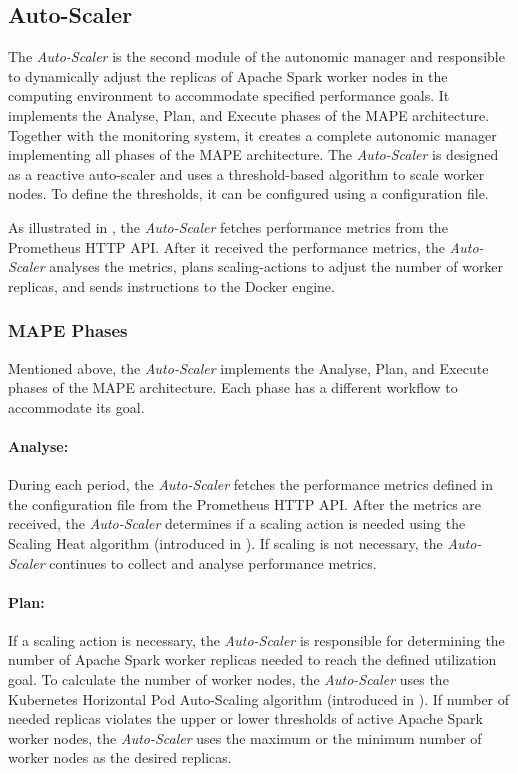 \subsection{Auto-Scaler}
The \textit{Auto-Scaler} is the second module of the autonomic manager and responsible to dynamically adjust the replicas of Apache Spark worker nodes in the computing environment to accommodate specified performance goals. 
It implements the Analyse, Plan, and Execute phases of the MAPE architecture. Together with the monitoring system, it creates a complete autonomic manager implementing all phases of the MAPE architecture.
The \textit{Auto-Scaler} is designed as a reactive auto-scaler and uses a threshold-based algorithm to scale worker nodes. To define the thresholds, it can be configured using a configuration file.


As illustrated in , the \textit{Auto-Scaler} fetches performance metrics from the Prometheus HTTP API.
After it received the performance metrics, the \textit{Auto-Scaler} analyses the metrics, plans scaling-actions to adjust the number of worker replicas, and sends instructions to the Docker engine.


\subsubsection{MAPE Phases}
Mentioned above, the \textit{Auto-Scaler} implements the Analyse, Plan, and Execute phases of the MAPE architecture. Each phase has a different workflow to accommodate its goal.

\paragraph{Analyse:}
During each period, the \textit{Auto-Scaler} fetches the performance metrics defined in the configuration file from the Prometheus HTTP API.
After the metrics are received, the \textit{Auto-Scaler} determines if a scaling action is needed using the Scaling Heat algorithm (introduced in ). If scaling is not necessary, the \textit{Auto-Scaler} continues to collect and analyse performance metrics.

\paragraph{Plan:}
If a scaling action is necessary, the \textit{Auto-Scaler} is responsible for determining the number of Apache Spark worker replicas needed to reach the defined utilization goal.
To calculate the number of worker nodes, the \textit{Auto-Scaler} uses the Kubernetes Horizontal Pod Auto-Scaling algorithm (introduced in ).
If number of needed replicas violates the upper or lower thresholds of active Apache Spark worker nodes, the \textit{Auto-Scaler} uses the maximum or the minimum number of worker nodes as the desired replicas.

